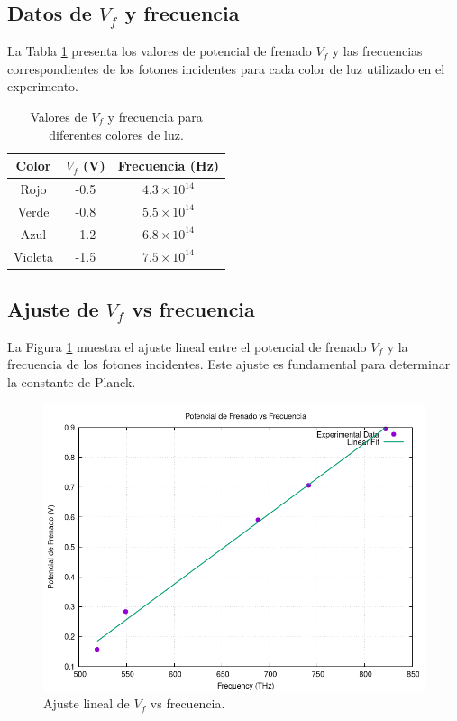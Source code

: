 \documentclass[twocolumn,a4paper,11pt]{scrartcl}
\begin{document}
\subsection{Datos de $V_f$ y frecuencia}

La Tabla \ref{tab:vf_frecuencia} presenta los valores de potencial de frenado $V_f$ y las frecuencias correspondientes de los fotones incidentes para cada color de luz utilizado en el experimento.

\begin{table}[h]
\centering
\caption{Valores de $V_f$ y frecuencia para diferentes colores de luz.}
\label{tab:vf_frecuencia}
\begin{tabular}{|c|c|c|}
\hline
Color & $V_f$ (V) & Frecuencia (Hz) \\
\hline
Rojo & -0.5 & $4.3 \times 10^{14}$ \\
Verde & -0.8 & $5.5 \times 10^{14}$ \\
Azul & -1.2 & $6.8 \times 10^{14}$ \\
Violeta & -1.5 & $7.5 \times 10^{14}$ \\
\hline
\end{tabular}
\end{table}

\subsection{Ajuste de $V_f$ vs frecuencia}

La Figura \ref{fig:vf_vs_frecuencia} muestra el ajuste lineal entre el potencial de frenado $V_f$ y la frecuencia de los fotones incidentes. Este ajuste es fundamental para determinar la constante de Planck.

\begin{figure}[h]
    \centering
    \includegraphics[width=0.8\linewidth]{vf_vs_frecuencia.png}
    \caption{Ajuste lineal de $V_f$ vs frecuencia.}
    \label{fig:vf_vs_frecuencia}
\end{figure}
\end{document}
